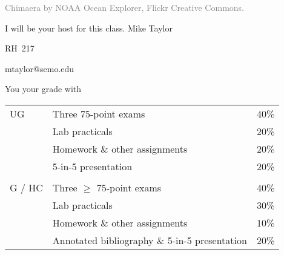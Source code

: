 \documentclass[t]{beamer}
\begin{document}


{
\begin{frame}[b,plain]
	\hfill\tiny\textcolor{gray}{Chimaera by NOAA Ocean Explorer, Flickr Creative Commons.}
\end{frame}
}

{
\begin{frame}[t,plain]{I will be your host for this class.}
	\vspace{5ex}
	\hangpara\hspace{17em} Mike Taylor

	\hangpara\hspace{17em} RH~217

	\hangpara\hspace{17em} mtaylor@semo.edu

\end{frame}
}

\begin{frame}[t]{You  your grade with}
	\begin{center}\large\begin{tabular}{@{}lll@{}}
	UG		&	Three 75-point exams 				& 	40\% \\
			&	Lab practicals 			& 	20\% \\
			&	Homework \& other assignments	&	20\% \\
			&	5-in-5 presentation 					& 	20\% \\
			&										&	\\
	G / HC	&	Three $\geq$ 75-point exams 		& 	40\% \\
			&	Lab practicals 			& 	30\% \\
			& Homework \& other assignments	&	10\% \\
			&	Annotated bibliography \& 5-in-5 presentation &	20\% \\
	\end{tabular}
	\end{center}

	\vspace{1.5\baselineskip}

	
	

\end{frame}
\end{document}
